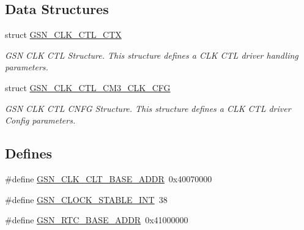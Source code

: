 \subsection*{Data Structures}
\begin{DoxyCompactItemize}
\item 
struct \hyperlink{a00039}{GSN\_\-CLK\_\-CTL\_\-CTX}
\begin{DoxyCompactList}\small\item\em GSN CLK CTL Structure. This structure defines a CLK CTL driver handling parameters. \end{DoxyCompactList}\item 
struct \hyperlink{a00038}{GSN\_\-CLK\_\-CTL\_\-CM3\_\-CLK\_\-CFG}
\begin{DoxyCompactList}\small\item\em GSN CLK CTL CNFG Structure. This structure defines a CLK CTL driver Config parameters. \end{DoxyCompactList}\end{DoxyCompactItemize}
\subsection*{Defines}
\begin{DoxyCompactItemize}
\item 
\#define \hyperlink{a00477_aa4db632255f1ef5cbe18f32c947d868f}{GSN\_\-CLK\_\-CLT\_\-BASE\_\-ADDR}~0x40070000
\item 
\#define \hyperlink{a00477_acb6ca13b15c69b10ce12002e75a8991f}{GSN\_\-CLOCK\_\-STABLE\_\-INT}~38
\item 
\#define \hyperlink{a00477_a2040e61f2f25e41f8c4fd747638fecda}{GSN\_\-RTC\_\-BASE\_\-ADDR}~0x41000000
\end{DoxyCompactItemize}
